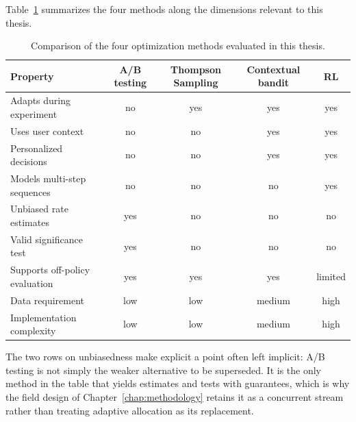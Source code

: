 Table~\ref{tab:method_comparison} summarizes the four methods along the dimensions relevant to this thesis.

\begin{table}[htbp]
    \centering
    \caption{Comparison of the four optimization methods evaluated in this thesis.}
    \label{tab:method_comparison}
    \small
    \begin{tabular}{lcccc}
        \toprule
        Property & A/B testing & Thompson Sampling & Contextual bandit & RL \\
        \midrule
        Adapts during experiment      & no  & yes & yes & yes \\
        Uses user context             & no  & no  & yes & yes \\
        Personalized decisions        & no  & no  & yes & yes \\
        Models multi-step sequences   & no  & no  & no  & yes \\
        Unbiased rate estimates       & yes & no  & no  & no  \\
        Valid significance test       & yes & no  & no  & no  \\
        Supports off-policy evaluation & yes & yes & yes & limited \\
        Data requirement              & low & low & medium & high \\
        Implementation complexity     & low & low & medium & high \\
        \bottomrule
    \end{tabular}
\end{table}

The two rows on unbiasedness make explicit a point often left implicit: A/B testing is not simply the weaker alternative to be superseded. It is the only method in the table that yields estimates and tests with guarantees, which is why the field design of Chapter~\ref{chap:methodology} retains it as a concurrent stream rather than treating adaptive allocation as its replacement.
